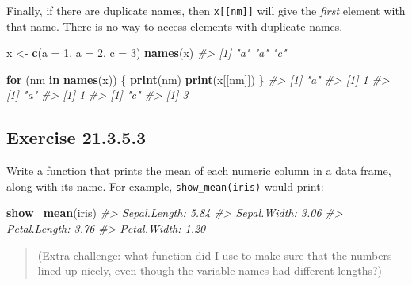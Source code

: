 \documentclass[]{book}
\newenvironment{Shaded}{\begin{snugshade}}{\end{snugshade}}
\newcommand{\CommentTok}[1]{\textcolor[rgb]{0.56,0.35,0.01}{\textit{#1}}}
\newcommand{\ControlFlowTok}[1]{\textcolor[rgb]{0.13,0.29,0.53}{\textbf{#1}}}
\newcommand{\DataTypeTok}[1]{\textcolor[rgb]{0.13,0.29,0.53}{#1}}
\newcommand{\DecValTok}[1]{\textcolor[rgb]{0.00,0.00,0.81}{#1}}
\newcommand{\KeywordTok}[1]{\textcolor[rgb]{0.13,0.29,0.53}{\textbf{#1}}}
\newcommand{\NormalTok}[1]{#1}
\newcommand{\StringTok}[1]{\textcolor[rgb]{0.31,0.60,0.02}{#1}}
\theoremstyle{plain}
\theoremstyle{remark}
\begin{document}
Finally, if there are duplicate names, then \texttt{x{[}{[}nm{]}{]}} will give the \emph{first} element with that name.
There is no way to access elements with duplicate names.

\begin{Shaded}
\begin{Highlighting}[]
\NormalTok{x <-}\StringTok{ }\KeywordTok{c}\NormalTok{(}\DataTypeTok{a =} \DecValTok{1}\NormalTok{, }\DataTypeTok{a =} \DecValTok{2}\NormalTok{, }\DataTypeTok{c =} \DecValTok{3}\NormalTok{)}
\KeywordTok{names}\NormalTok{(x)}
\CommentTok{#> [1] "a" "a" "c"}
\end{Highlighting}
\end{Shaded}

\begin{Shaded}
\begin{Highlighting}[]
\ControlFlowTok{for}\NormalTok{ (nm }\ControlFlowTok{in} \KeywordTok{names}\NormalTok{(x)) \{}
  \KeywordTok{print}\NormalTok{(nm)}
  \KeywordTok{print}\NormalTok{(x[[nm]])}
\NormalTok{\}}
\CommentTok{#> [1] "a"}
\CommentTok{#> [1] 1}
\CommentTok{#> [1] "a"}
\CommentTok{#> [1] 1}
\CommentTok{#> [1] "c"}
\CommentTok{#> [1] 3}
\end{Highlighting}
\end{Shaded}

\hypertarget{exercise-21.3.5.3}{%
\subsection*{\texorpdfstring{Exercise {21.3.5.3}}{Exercise 21.3.5.3}}\label{exercise-21.3.5.3}}

Write a function that prints the mean of each numeric column in a data frame, along with its name.
For example, \texttt{show\_mean(iris)} would print:

\begin{Shaded}
\begin{Highlighting}[]
\KeywordTok{show_mean}\NormalTok{(iris)}
\CommentTok{#> Sepal.Length: 5.84}
\CommentTok{#> Sepal.Width:  3.06}
\CommentTok{#> Petal.Length: 3.76}
\CommentTok{#> Petal.Width:  1.20}
\end{Highlighting}
\end{Shaded}

\begin{quote}
(Extra challenge: what function did I use to make sure that the numbers lined up nicely, even though the variable names had different lengths?)
\end{quote}
\end{document}
